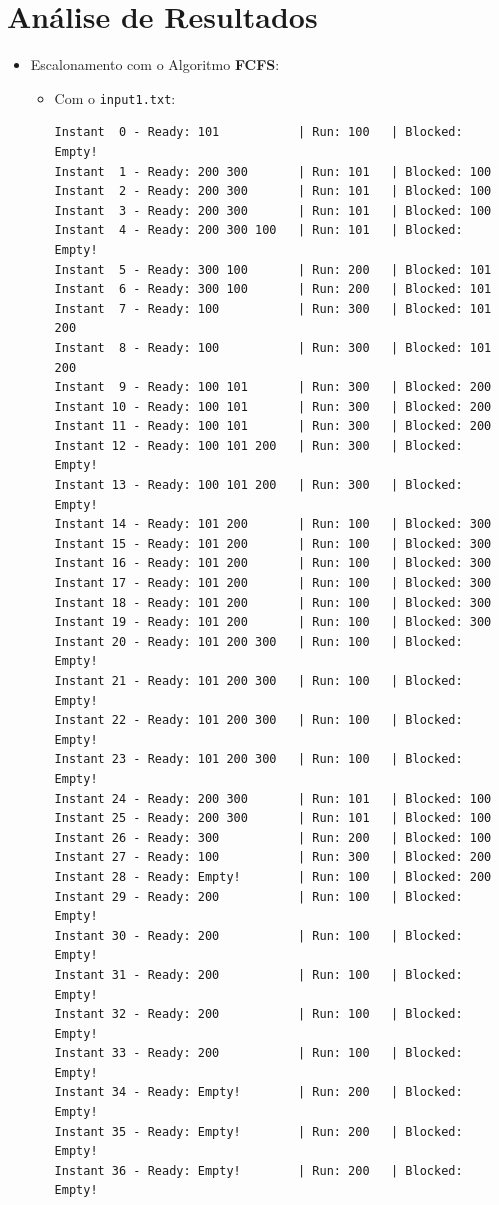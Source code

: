 \documentclass[11pt]{article}   %
\begin{document}
\section{Análise de Resultados} %
\begin{itemize}
    \item Escalonamento com o Algoritmo \textbf{FCFS}:
    \begin{itemize}
        \item Com o \verb|input1.txt|:
        \begin{verbatim}
Instant  0 - Ready: 101           | Run: 100   | Blocked: Empty!
Instant  1 - Ready: 200 300       | Run: 101   | Blocked: 100 
Instant  2 - Ready: 200 300       | Run: 101   | Blocked: 100 
Instant  3 - Ready: 200 300       | Run: 101   | Blocked: 100 
Instant  4 - Ready: 200 300 100   | Run: 101   | Blocked: Empty!
Instant  5 - Ready: 300 100       | Run: 200   | Blocked: 101 
Instant  6 - Ready: 300 100       | Run: 200   | Blocked: 101 
Instant  7 - Ready: 100           | Run: 300   | Blocked: 101 200 
Instant  8 - Ready: 100           | Run: 300   | Blocked: 101 200 
Instant  9 - Ready: 100 101       | Run: 300   | Blocked: 200 
Instant 10 - Ready: 100 101       | Run: 300   | Blocked: 200 
Instant 11 - Ready: 100 101       | Run: 300   | Blocked: 200 
Instant 12 - Ready: 100 101 200   | Run: 300   | Blocked: Empty!
Instant 13 - Ready: 100 101 200   | Run: 300   | Blocked: Empty!
Instant 14 - Ready: 101 200       | Run: 100   | Blocked: 300 
Instant 15 - Ready: 101 200       | Run: 100   | Blocked: 300 
Instant 16 - Ready: 101 200       | Run: 100   | Blocked: 300 
Instant 17 - Ready: 101 200       | Run: 100   | Blocked: 300 
Instant 18 - Ready: 101 200       | Run: 100   | Blocked: 300 
Instant 19 - Ready: 101 200       | Run: 100   | Blocked: 300 
Instant 20 - Ready: 101 200 300   | Run: 100   | Blocked: Empty!
Instant 21 - Ready: 101 200 300   | Run: 100   | Blocked: Empty!
Instant 22 - Ready: 101 200 300   | Run: 100   | Blocked: Empty!
Instant 23 - Ready: 101 200 300   | Run: 100   | Blocked: Empty!
Instant 24 - Ready: 200 300       | Run: 101   | Blocked: 100 
Instant 25 - Ready: 200 300       | Run: 101   | Blocked: 100 
Instant 26 - Ready: 300           | Run: 200   | Blocked: 100 
Instant 27 - Ready: 100           | Run: 300   | Blocked: 200 
Instant 28 - Ready: Empty!        | Run: 100   | Blocked: 200 
Instant 29 - Ready: 200           | Run: 100   | Blocked: Empty!
Instant 30 - Ready: 200           | Run: 100   | Blocked: Empty!
Instant 31 - Ready: 200           | Run: 100   | Blocked: Empty!
Instant 32 - Ready: 200           | Run: 100   | Blocked: Empty!
Instant 33 - Ready: 200           | Run: 100   | Blocked: Empty!
Instant 34 - Ready: Empty!        | Run: 200   | Blocked: Empty!
Instant 35 - Ready: Empty!        | Run: 200   | Blocked: Empty!
Instant 36 - Ready: Empty!        | Run: 200   | Blocked: Empty!    
    

\end{verbatim}
\end{itemize}
\end{itemize}
\end{document}
